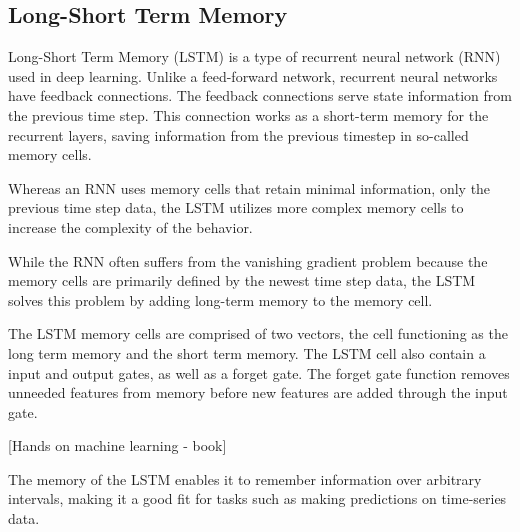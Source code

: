 \cite[p.~492-493]{Geron2017}





\iffalse
  \subsection{Long-Short Term Memory}

  Long-Short Term Memory (LSTM) is a type of recurrent neural network (RNN) used in deep learning.
  Unlike a feed-forward network, recurrent neural networks have feedback connections.
  The feedback connections serve state information from the previous time step.
  This connection works as a short-term memory for the recurrent layers, saving information from the previous timestep in so-called memory cells.

  Whereas an RNN uses memory cells that retain minimal information, only the previous time step data, the LSTM utilizes more complex memory cells to increase the complexity of the behavior.

  While the RNN often suffers from the vanishing gradient problem because the memory cells are primarily defined by the newest time step data, the LSTM solves this problem by adding long-term memory to the memory cell.

  The LSTM memory cells are comprised of two vectors, the cell functioning as the long term memory and the short term memory.
  The LSTM cell also contain a input and output gates, as well as a forget gate.
  The forget gate function removes unneeded features from memory before new features are added through the input gate.

  [Hands on machine learning - book]

  The memory of the LSTM enables it to remember information over arbitrary intervals, making it a good fit for tasks such as making predictions on time-series data.

